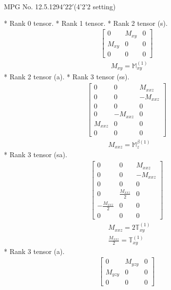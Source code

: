 \documentclass[fleqn,8pt,landscape]{jsarticle}
\begin{document}
\setcounter{MaxMatrixCols}{32}

\renewcommand{\tablename}{Table~}
\renewcommand{\figurename}{Figure~}
\begin{center}
\LARGE
MPG No. 12.5.129\quad$4'22'$\quad(4'2'2 setting)
\end{center}
* Rank 0 tensor.
* Rank 1 tensor.
* Rank 2 tensor (s).
\begin{align*}
\begin{bmatrix} 0 & M_{xy} & 0 \\ M_{xy} & 0 & 0 \\ 0 & 0 & 0 \end{bmatrix}
\end{align*}
\begin{align*}
& M_{xy} = \mathbb{M}_{xy}^{(1)}
\end{align*}
* Rank 2 tensor (a).
* Rank 3 tensor (ss).
\begin{align*}
\begin{bmatrix} 0 & 0 & M_{xxz} \\ 0 & 0 & - M_{xxz} \\ 0 & 0 & 0 \\ 0 & - M_{xxz} & 0 \\ M_{xxz} & 0 & 0 \\ 0 & 0 & 0 \end{bmatrix}
\end{align*}
\begin{align*}
& M_{xxz} = \mathbb{M}_{z}^{\beta(1)}
\end{align*}
* Rank 3 tensor (sa).
\begin{align*}
\begin{bmatrix} 0 & 0 & M_{xxz} \\ 0 & 0 & - M_{xxz} \\ 0 & 0 & 0 \\ 0 & \frac{M_{xxz}}{2} & 0 \\ - \frac{M_{xxz}}{2} & 0 & 0 \\ 0 & 0 & 0 \end{bmatrix}
\end{align*}
\begin{align*}
& M_{xxz} = 2 \mathbb{T}_{xy}^{(1)} \\
& \frac{M_{xxz}}{2} = \mathbb{T}_{xy}^{(1)}
\end{align*}
* Rank 3 tensor (a).
\begin{align*}
\begin{bmatrix} 0 & M_{yzy} & 0 \\ M_{yzy} & 0 & 0 \\ 0 & 0 & 0 \end{bmatrix}
\end{align*}
\end{document}

